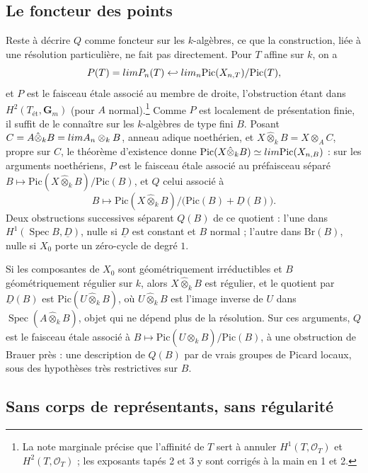 \documentclass[11pt,a4paper]{article}
\begin{document}
\subsection*{Le foncteur des points}

Reste à décrire $Q$ comme foncteur sur les $k$-algèbres, ce que la
construction, liée à une résolution particulière, ne fait pas directement.
Pour $T$ affine sur $k$, on a
\[
P(T) = \varprojlim P_n(T) \hookleftarrow \varprojlim_n \mathrm{Pic}(X_{n,T})/\mathrm{Pic}(T) ,
\]
et $P$ est le faisceau étale associé au membre de droite, l'obstruction étant
dans $H^2(T_{\text{ét}}, \mathbf{G}_m)$ (pour $A$ normal).\footnote{La note
marginale précise que l'affinité de $T$ sert à annuler
$H^1(T, \mathcal{O}_T)$ et $H^2(T, \mathcal{O}_T)$ ; les exposants tapés 2 et
3 y sont corrigés à la main en 1 et 2.} Comme $P$ est localement de
présentation finie, il suffit de le connaître sur les $k$-algèbres de type
fini $B$. Posant $C = A \hat{\otimes}_k B = \varprojlim A_n \otimes_k B$,
anneau adique noethérien, et $X \hat{\otimes}_k B = X \otimes_A C$, propre sur
$C$, le théorème d'existence donne
$\mathrm{Pic}(X \hat{\otimes}_k B) \simeq \varprojlim \mathrm{Pic}(X_{n,B})$ :
sur les arguments noethériens, $P$ est le faisceau étale associé au préfaisceau
séparé $B \mapsto \mathrm{Pic}(X \hat{\otimes}_k B)/\mathrm{Pic}(B)$, et $Q$
celui associé à
\[
B \longmapsto \mathrm{Pic}(X \hat{\otimes}_k B)/\bigl(\mathrm{Pic}(B) + \underline{D}(B)\bigr) .
\]
Deux obstructions successives séparent $Q(B)$ de ce quotient : l'une dans
$H^1(\operatorname{Spec} B, \underline{D})$, nulle si $\underline{D}$ est
constant et $B$ normal ; l'autre dans $\mathrm{Br}(B)$, nulle si $X_0$ porte un
zéro-cycle de degré $1$.

Si les composantes de $X_0$ sont géométriquement irréductibles et $B$
géométriquement régulier sur $k$, alors $X \hat{\otimes}_k B$ est régulier, et
le quotient par $\underline{D}(B)$ est $\mathrm{Pic}(U \hat{\otimes}_k B)$, où
$U \hat{\otimes}_k B$ est l'image inverse de $U$ dans
$\operatorname{Spec}(A \hat{\otimes}_k B)$, objet qui ne dépend plus de la
résolution. Sur ces arguments, $Q$ est le faisceau étale associé à
$B \mapsto \mathrm{Pic}(U \hat{\otimes}_k B)/\mathrm{Pic}(B)$, à une
obstruction de Brauer près : une description de $Q(B)$ par de vrais groupes de
Picard locaux, sous des hypothèses très restrictives sur $B$.

\subsection*{Sans corps de représentants, sans régularité}
\end{document}
